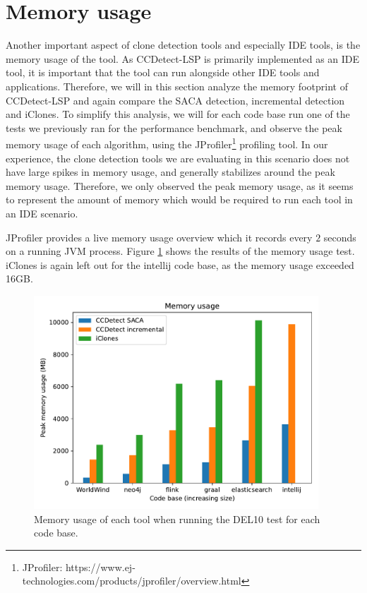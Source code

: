 \vfill
\newpage

\section{Memory usage}

Another important aspect of clone detection tools and especially IDE tools, is the memory
usage of the tool. As CCDetect-LSP is primarily implemented as an IDE tool, it is
important that the tool can run alongside other IDE tools and applications. Therefore, we
will in this section analyze the memory footprint of CCDetect-LSP and again compare the
SACA detection, incremental detection and iClones. To simplify this analysis, we will for
each code base run one of the tests we previously ran for the performance benchmark, and
observe the peak memory usage of each algorithm, using the JProfiler\footnote{JProfiler:
https://www.ej-technologies.com/products/jprofiler/overview.html} profiling tool. In our
experience, the clone detection tools we are evaluating in this scenario does not have
large spikes in memory usage, and generally stabilizes around the peak memory usage.
Therefore, we only observed the peak memory usage, as it seems to represent the amount of
memory which would be required to run each tool in an IDE scenario.

JProfiler provides a live memory usage overview which it records every $2$ seconds on a
running JVM process. Figure \ref{fig:memoryusage} shows the results of the memory usage
test. iClones is again left out for the intellij code base, as the memory usage exceeded
16GB.

\begin{figure}[t]
    \begin{center}
        \includegraphics[width=0.95\textwidth]{figures/memoryusage.pdf}
    \end{center}
    \caption{Memory usage of each tool when running the DEL10 test for each code base.}
    \label{fig:memoryusage}
\end{figure}


